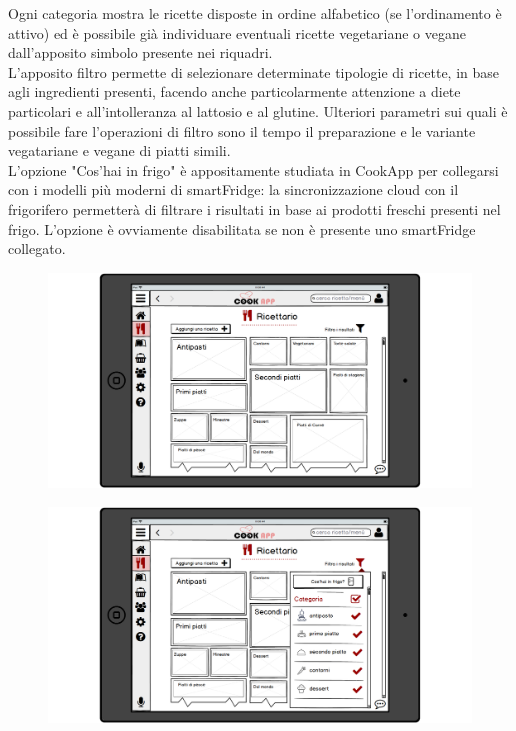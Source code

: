 Ogni categoria mostra le ricette disposte in ordine alfabetico (se l'ordinamento è attivo) ed è possibile già individuare eventuali ricette vegetariane o vegane dall'apposito simbolo presente nei riquadri.\\
L'apposito filtro permette di selezionare determinate tipologie di ricette, in base agli ingredienti presenti, facendo anche particolarmente attenzione a diete particolari e all'intolleranza al lattosio e al glutine. Ulteriori parametri sui quali è possibile fare l'operazioni di filtro sono il tempo il preparazione e le variante vegatariane e vegane di piatti simili.\\
L'opzione "Cos'hai in frigo" è appositamente studiata in CookApp per collegarsi con i modelli più moderni di smartFridge: la sincronizzazione cloud con il frigorifero permetterà di filtrare i risultati in base ai prodotti freschi presenti nel frigo. L'opzione è ovviamente disabilitata se non è presente uno smartFridge collegato.\\
\begin{figure}[H]
	\centering
	\includegraphics[width=0.95\linewidth]{img/mockup/Ricettario.png}
\end{figure}
\begin{figure}[H]
	\centering
	\includegraphics[width=0.95\linewidth]{img/mockup/Ricettario-filtro.png}
\end{figure}
